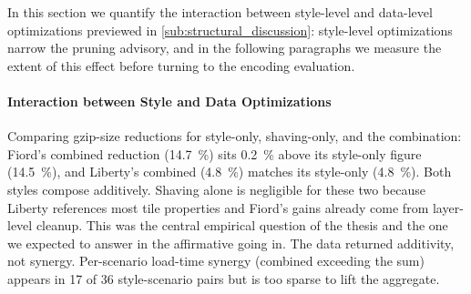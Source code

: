 In this section we quantify the interaction between style-level and data-level optimizations previewed in \cref{sub:structural_discussion}: style-level optimizations narrow the pruning advisory, and in the following paragraphs we measure the extent of this effect before turning to the encoding evaluation.

\paragraph{Interaction between Style and Data Optimizations}
Comparing gzip-size reductions for style-only, shaving-only, and the combination: Fiord's combined reduction (\qty{14.7}{\percent}) sits \qty{0.2}{\percent} above its style-only figure (\qty{14.5}{\percent}), and Liberty's combined (\qty{4.8}{\percent}) matches its style-only (\qty{4.8}{\percent}).
Both styles compose additively.
Shaving alone is negligible for these two because Liberty references most tile properties and Fiord's gains already come from layer-level cleanup.
This was the central empirical question of the thesis and the one we expected to answer in the affirmative going in.
The data returned additivity, not synergy.
Per-scenario load-time synergy (combined exceeding the sum) appears in 17 of 36 style-scenario pairs but is too sparse to lift the aggregate.

